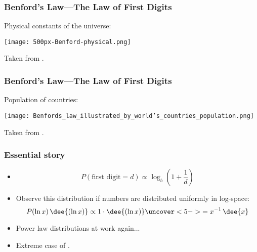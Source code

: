 \begin{frame}
  \frametitle{Benford's Law---The Law of First Digits}

  \begin{block}{Physical constants of the universe:}

    \medskip

    \begin{center}
      \texttt{[image: 500px-Benford-physical.png]}
    \end{center}
  \end{block}

   Taken from .

\end{frame}

\begin{frame}
  \frametitle{Benford's Law---The Law of First Digits}

  \begin{block}{Population of countries:}

    \medskip

    \begin{center}
      \texttt{[image: Benfords\_law\_illustrated\_by\_world's\_countries\_population.png]}
    \end{center}
  \end{block}

   Taken from .

\end{frame}

\begin{frame}
  \frametitle{Essential story}

  \begin{block}{}
  \begin{itemize}
  \item<1-> 
    $$ 
    P(\mbox{first digit} = d) \propto
    \log_b \left( 1 + \frac{1}{d} \right) 
    $$
  \item<4->
    Observe this distribution if numbers are distributed uniformly in log-space:
    $$
    P(\ln{x})\, \dee{(\ln{x})} \propto 1 \cdot \dee{(\ln{x})} 
    \uncover<5->{= x^{-1}\, \dee{x}}
    $$
  \item<6->
    Power law distributions at work again...  
  \item<7->
    Extreme case of .
  \end{itemize}
  \end{block}

\end{frame}

